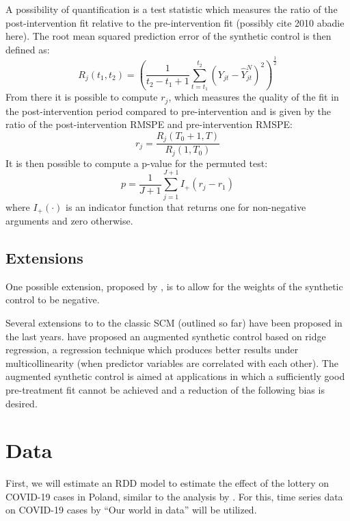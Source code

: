 \documentclass{scrbook}
\begin{document}
A possibility of quantification is a test statistic which measures the
ratio of the post-intervention fit relative to the pre-intervention fit
(possibly cite 2010 abadie here). The root mean squared prediction error
of the synthetic control is then defined as: \begin{equation}
R_{j}(t_{1},t_{2}) =(\frac{1}{t_{2}-t_{1}+1}\sum_{t=t_{1}}^{t_{2}}(Y_{jt}-\hat{Y}_{jt}^{N})^2)^\frac{1}{2}
\end{equation} From there it is possible to compute \(r_{j}\), which
measures the quality of the fit in the post-intervention period compared
to pre-intervention and is given by the ratio of the post-intervention
RMSPE and pre-intervention RMSPE: \begin{equation}
r_{j}=\frac{R_{j}(T_{0}+1,T)}{R_{j}(1,T_{0})}
\end{equation} It is then possible to compute a p-value for the permuted
test: \begin{equation}
p=\frac{1}{J+1}\sum_{j=1}^{J+1}I_{+}(r_{j}-r_{1})
\end{equation} where \(I_{+}(\cdot)\) is an indicator function that
returns one for non-negative arguments and zero otherwise.

\subsection*{Extensions}

One possible extension, proposed by
\textcite{doudchenko_balancing_2016}, is to allow for the weights of the
synthetic control to be negative.

Several extensions to to the classic SCM (outlined so far) have been
proposed in the last years. \textcite{ben-michael_augmented_2021} have
proposed an augmented synthetic control based on ridge regression, a
regression technique which produces better results under
multicollinearity (when predictor variables are correlated with each
other). The augmented synthetic control is aimed at applications in
which a sufficiently good pre-treatment fit cannot be achieved and a
reduction of the following bias is desired.

\section{Data}

First, we will estimate an RDD model to estimate the effect of the
lottery on COVID-19 cases in Poland, similar to the analysis by
\textcite{kuznetsova_effectiveness_2022}. For this, time series data on
COVID-19 cases by ``Our world in data'' will be utilized.
\end{document}
